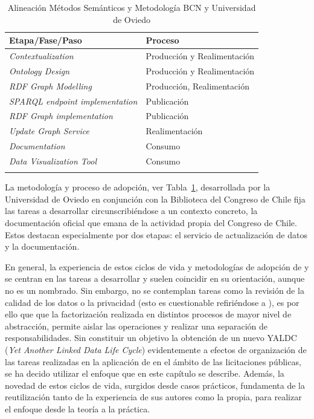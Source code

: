 \begin{longtable}[c]{|p{6cm}|p{8cm}|} 

\hline

  \textbf{Etapa/Fase/Paso} &  \textbf{Proceso} \\\hline

\endhead
\textit{Contextualization} & Producción y Realimentación \\ \hline
\textit{Ontology Design} & Producción y Realimentación \\ \hline
\textit{RDF Graph Modelling} & Producción, Realimentación \\ \hline
\textit{SPARQL endpoint implementation} & Publicación \\ \hline
\textit{RDF Graph implementation} & Publicación \\ \hline
\textit{Update Graph Service} & Realimentación \\ \hline
\textit{Documentation} & Consumo \\ \hline
\textit{Data Visualization Tool} & Consumo \\ \hline
\hline
\caption{Alineación Métodos Semánticos y Metodología BCN y Universidad de Oviedo}  \label{tabla:metodos-bcn}\\    
\end{longtable}

La metodología y proceso de adopción, ver Tabla~\ref{tabla:metodos-bcn}, desarrollada por la Universidad de Oviedo en conjunción con la 
Biblioteca del Congreso de Chile fija las tareas a desarrollar circunscribiéndose a un contexto concreto, la documentación 
oficial que emana de la actividad propia del Congreso de Chile. Estos destacan especialmente por dos etapas: el servicio de actualización de datos
y la documentación.

En general, la experiencia de estos ciclos de vida y metodologías de adopción de \linkeddata y \lod se centran
en las tareas a desarrollar y suelen coincidir en su orientación, aunque no es un nombrado. Sin embargo,
no se contemplan tareas como la revisión de la calidad de los datos o la privacidad (esto es cuestionable refiriéndose a \lod), 
es por ello que que la factorización realizada en distintos procesos de mayor nivel de abstracción, permite aislar 
las operaciones y realizar una separación de responsabilidades. Sin constituir un objetivo la obtención de un nuevo 
YALDC (\textit{Yet Another Linked Data Life Cycle}) evidentemente a efectos de organización de las tareas realizadas
en la aplicación de \linkeddata en el ámbito de las licitaciones públicas, se ha decido utilizar el enfoque
que en este capítulo se describe. Además, la novedad de estos ciclos de vida, surgidos
desde casos prácticos, fundamenta de la reutilización tanto de la experiencia de sus autores como la propia, para realizar 
el enfoque desde la teoría a la práctica.


